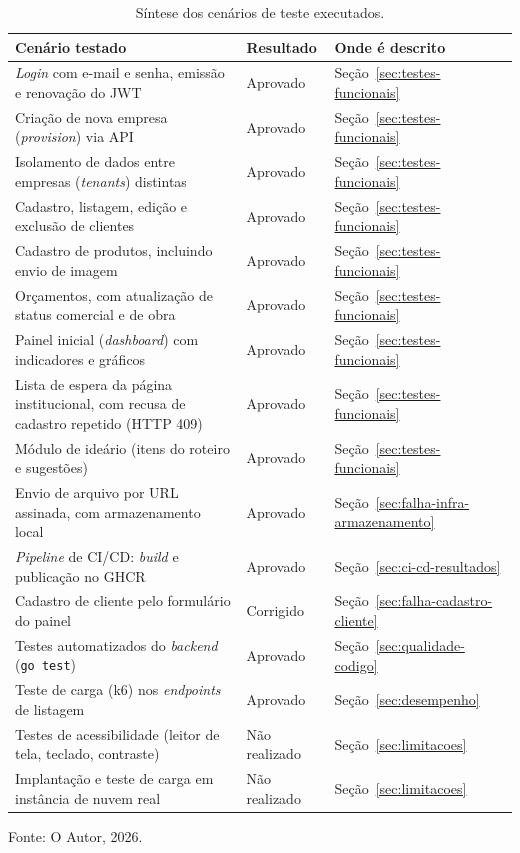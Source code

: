 \begin{table}[H]
  \centering
  \caption{Síntese dos cenários de teste executados.}
  \label{tab:checklist-testes}
  \small
  \begin{tabular}{p{7.9cm}p{2.8cm}p{2.9cm}}
    \hline
    \textbf{Cenário testado} & \textbf{Resultado} & \textbf{Onde é descrito} \\
    \hline
    \textit{Login} com e-mail e senha, emissão e renovação do JWT & Aprovado & Seção~\ref{sec:testes-funcionais} \\
    Criação de nova empresa (\textit{provision}) via API & Aprovado & Seção~\ref{sec:testes-funcionais} \\
    Isolamento de dados entre empresas (\textit{tenants}) distintas & Aprovado & Seção~\ref{sec:testes-funcionais} \\
    Cadastro, listagem, edição e exclusão de clientes & Aprovado & Seção~\ref{sec:testes-funcionais} \\
    Cadastro de produtos, incluindo envio de imagem & Aprovado & Seção~\ref{sec:testes-funcionais} \\
    Orçamentos, com atualização de status comercial e de obra & Aprovado & Seção~\ref{sec:testes-funcionais} \\
    Painel inicial (\textit{dashboard}) com indicadores e gráficos & Aprovado & Seção~\ref{sec:testes-funcionais} \\
    Lista de espera da página institucional, com recusa de cadastro repetido (HTTP 409) & Aprovado & Seção~\ref{sec:testes-funcionais} \\
    Módulo de ideário (itens do roteiro e sugestões) & Aprovado & Seção~\ref{sec:testes-funcionais} \\
    Envio de arquivo por URL assinada, com armazenamento local & Aprovado & Seção~\ref{sec:falha-infra-armazenamento} \\
    \textit{Pipeline} de CI/CD: \textit{build} e publicação no GHCR & Aprovado & Seção~\ref{sec:ci-cd-resultados} \\
    Cadastro de cliente pelo formulário do painel & Corrigido & Seção~\ref{sec:falha-cadastro-cliente} \\
    Testes automatizados do \textit{backend} (\texttt{go test}) & Aprovado & Seção~\ref{sec:qualidade-codigo} \\
    Teste de carga (k6) nos \textit{endpoints} de listagem & Aprovado & Seção~\ref{sec:desempenho} \\
    Testes de acessibilidade (leitor de tela, teclado, contraste) & Não realizado & Seção~\ref{sec:limitacoes} \\
    Implantação e teste de carga em instância de nuvem real & Não realizado & Seção~\ref{sec:limitacoes} \\
    \hline
  \end{tabular}
  \begin{minipage}{0.95\textwidth}
    \vspace{0.3em}
    {\small Fonte: O Autor, 2026.}
  \end{minipage}
\end{table}


